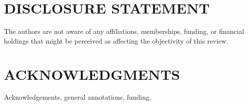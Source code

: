 \documentclass[letterpaper]{ar-1col}
\begin{document}
\section*{DISCLOSURE STATEMENT}
The authors are not aware of any affiliations, memberships, funding, or financial holdings that
might be perceived as affecting the objectivity of this review.

\section*{ACKNOWLEDGMENTS}
Acknowledgements, general annotations, funding.

%



  
\end{document}
